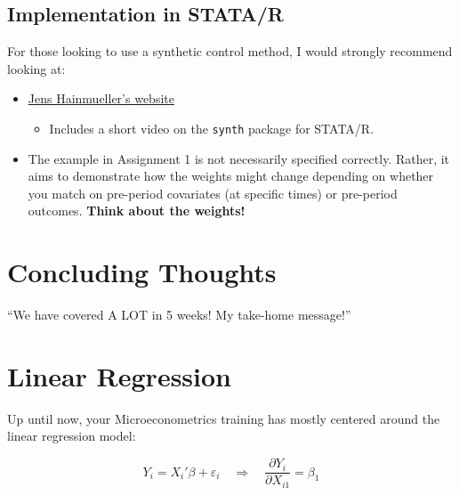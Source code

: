 \documentclass[
  letterpaper,
  DIV=11,
  numbers=noendperiod]{scrreprt}
\providecommand{\tightlist}{%
  \setlength{\itemsep}{0pt}\setlength{\parskip}{0pt}}\usepackage{longtable,booktabs,array}
\theoremstyle{definition}
\theoremstyle{remark}
\begin{document}
\section*{Implementation in STATA/R}\label{implementation-in-statar}


For those looking to use a synthetic control method, I would strongly
recommend looking at:

\begin{itemize}
\tightlist
\item
  \href{https://web.stanford.edu/~jhain/synthpage.html}{Jens
  Hainmueller's website}

  \begin{itemize}
  \tightlist
  \item
    Includes a short video on the \texttt{synth} package for STATA/R.
  \end{itemize}
\item
  The example in Assignment 1 is not necessarily specified correctly.
  Rather, it aims to demonstrate how the weights might change depending
  on whether you match on pre-period covariates (at specific times) or
  pre-period outcomes. \textbf{Think about the weights!}
\end{itemize}

\chapter*{Concluding Thoughts}\label{concluding-thoughts}


``We have covered A LOT in 5 weeks! My take-home message!''

\chapter*{Linear Regression}\label{linear-regression-1}


Up until now, your Microeconometrics training has mostly centered around
the linear regression model:

\[
Y_i = X_i'\beta + \varepsilon_i \quad \Rightarrow \quad \frac{\partial Y_i}{\partial X_{i1}} = \beta_1
\]
\end{document}
